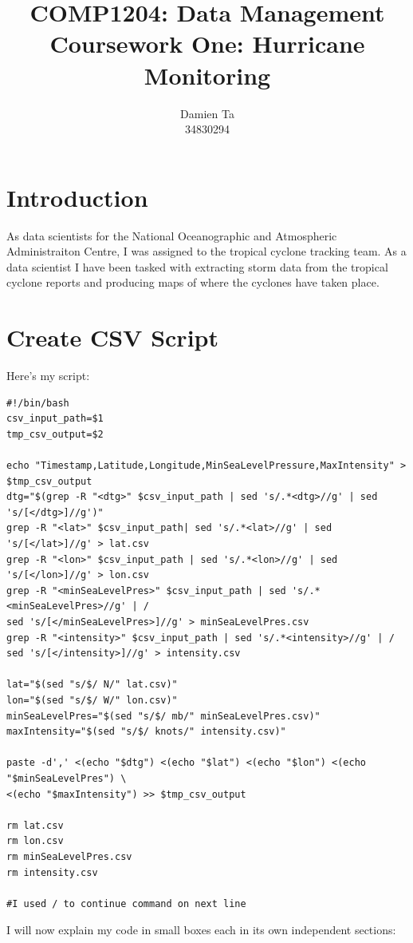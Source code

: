 \documentclass[]{article}
\title{COMP1204: Data Management \\ Coursework One: Hurricane Monitoring }
\author{Damien Ta \\ 34830294}
\begin{document}
\maketitle

\section{Introduction}
As data scientists for the National Oceanographic and Atmospheric Administraiton Centre, I was assigned to the tropical cyclone
tracking team. As a data scientist I have been tasked with extracting storm data from the tropical cyclone reports and producing
maps of where the cyclones have taken place.
\section{Create CSV Script}
Here's my script:
\begin{tcolorbox}[colback=white, colframe=black, boxrule=0.5pt, arc=2mm, 
    title=create\_csv.sh, fonttitle=\bfseries, listing only, listing options={language=sh, basicstyle=\ttfamily}]
    \begin{verbatim}
#!/bin/bash
csv_input_path=$1
tmp_csv_output=$2

echo "Timestamp,Latitude,Longitude,MinSeaLevelPressure,MaxIntensity" > $tmp_csv_output
dtg="$(grep -R "<dtg>" $csv_input_path | sed 's/.*<dtg>//g' | sed 's/[</dtg>]//g')"
grep -R "<lat>" $csv_input_path| sed 's/.*<lat>//g' | sed 's/[</lat>]//g' > lat.csv
grep -R "<lon>" $csv_input_path | sed 's/.*<lon>//g' | sed 's/[</lon>]//g' > lon.csv
grep -R "<minSeaLevelPres>" $csv_input_path | sed 's/.*<minSeaLevelPres>//g' | /
sed 's/[</minSeaLevelPres>]//g' > minSeaLevelPres.csv
grep -R "<intensity>" $csv_input_path | sed 's/.*<intensity>//g' | / 
sed 's/[</intensity>]//g' > intensity.csv

lat="$(sed "s/$/ N/" lat.csv)"
lon="$(sed "s/$/ W/" lon.csv)"
minSeaLevelPres="$(sed "s/$/ mb/" minSeaLevelPres.csv)"
maxIntensity="$(sed "s/$/ knots/" intensity.csv)"

paste -d',' <(echo "$dtg") <(echo "$lat") <(echo "$lon") <(echo "$minSeaLevelPres") \
<(echo "$maxIntensity") >> $tmp_csv_output

rm lat.csv
rm lon.csv
rm minSeaLevelPres.csv
rm intensity.csv

#I used / to continue command on next line
    \end{verbatim}
\end{tcolorbox}
I will now explain my code in small boxes each in its own independent sections:
\end{document}
